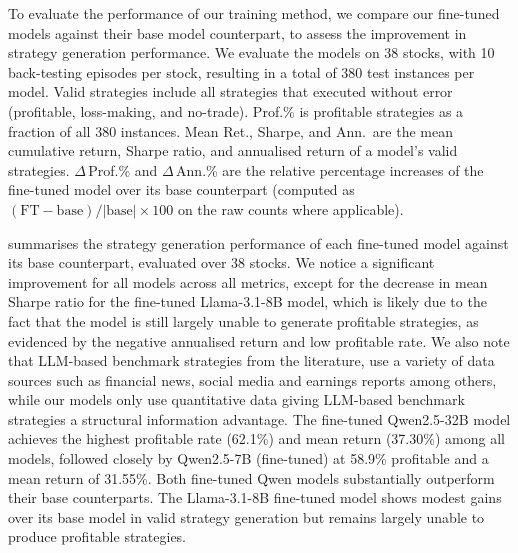 \documentclass[12pt, a4paper]{report}
\begin{document}
To evaluate the performance of our training method, we compare our fine-tuned models against their base model counterpart,
to assess the improvement in strategy generation performance. 
We evaluate the models on 38 stocks, with 10 back-testing episodes per stock, 
resulting in a total of 380 test instances per model. Valid strategies include all strategies that executed
without error (profitable, loss-making, and no-trade). Prof.\% is profitable strategies
as a fraction of all 380 instances.
Mean Ret., Sharpe, and Ann.\ are the mean cumulative return, Sharpe ratio, and annualised
return of a model's valid strategies. $\Delta$\,Prof.\% and $\Delta$\,Ann.\% are the
relative percentage increases of the fine-tuned model over its base counterpart
(computed as $(\text{FT}-\text{base})/|\text{base}|\times 100$ on the raw counts where applicable).

 summarises the strategy generation performance of each fine-tuned
model against its base counterpart, evaluated over 38 stocks. We notice a significant improvement for all models across all metrics, 
except for the decrease in mean Sharpe ratio for the fine-tuned Llama-3.1-8B model, which is likely due to the fact that the model is still largely unable to generate profitable strategies, as evidenced by the negative annualised return and low profitable rate.
We also note that LLM-based benchmark strategies from the literature, 
use a variety of data sources such as financial news, social media and earnings reports among others, 
while our models only use quantitative data giving LLM-based benchmark strategies a structural information advantage.
The fine-tuned Qwen2.5-32B model achieves the highest profitable rate (62.1\%) and mean return
(37.30\%) among all models, followed closely by Qwen2.5-7B (fine-tuned) at 58.9\% profitable and a
mean return of 31.55\%.  Both fine-tuned Qwen models substantially outperform their base counterparts.
The Llama-3.1-8B fine-tuned model shows modest gains over its base model in valid strategy
generation but remains largely unable to produce profitable strategies.
\end{document}
